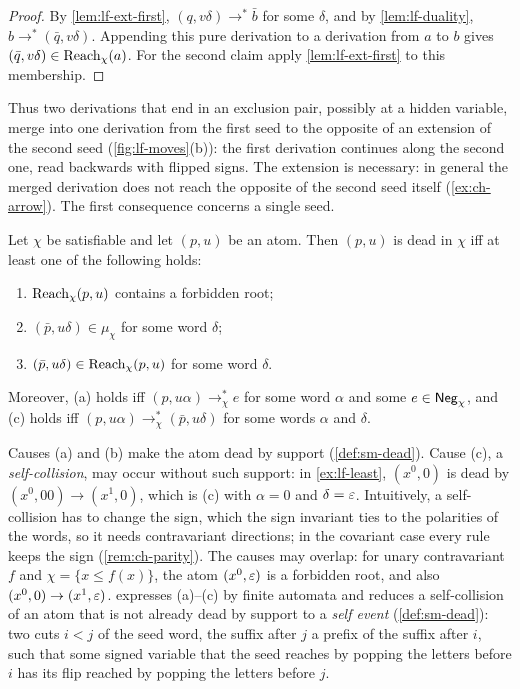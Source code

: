 \begin{proof}
By \cref{lem:lf-ext-first}, $(q,v\delta)\to^*\bar b$ for some $\delta$, and by
\cref{lem:lf-duality}, $b\to^*(\bar q,v\delta)$. Appending this pure
derivation to a derivation from $a$ to $b$ gives
$(\bar q,v\delta)\in \operatorname{Reach}_\chi(a)$. For the second claim apply
\cref{lem:lf-ext-first} to this membership.
\end{proof}

Thus two derivations that end in an exclusion pair, possibly at a hidden
variable, merge into one derivation from the first seed to the opposite of
an extension of the second seed (\cref{fig:lf-moves}(b)): the first
derivation continues along the second one, read backwards with flipped signs.
The extension is necessary: in general the
merged derivation does not reach the opposite of the second seed itself
(\cref{ex:ch-arrow}). The first consequence concerns a single seed.

\begin{corollary}[Deadness]\label{cor:lf-dead}
Let $\chi$ be satisfiable and let $(p,u)$ be an atom. Then $(p,u)$ is dead
in $\chi$ iff at least one of the following holds:
\begin{enumerate}[label=(\alph*),leftmargin=*]
\item $\operatorname{Reach}_\chi(p,u)$ contains a forbidden root;
\item $(\bar p,u\delta)\in\mu_\chi$ for some word $\delta$;
\item $(\bar p,u\delta)\in \operatorname{Reach}_\chi(p,u)$ for some word $\delta$.
\end{enumerate}
Moreover, (a) holds iff $(p,u\alpha)\to^*_\chi e$ for some word $\alpha$ and
some $e\in\mathsf{Neg}_\chi$, and (c) holds iff
$(p,u\alpha)\to^*_\chi(\bar p,u\delta)$ for some words $\alpha$ and $\delta$.
\end{corollary}

Causes (a) and (b) make the atom dead by support (\cref{def:sm-dead}).
Cause (c), a \emph{self-collision}, may occur without such support: in
\cref{ex:lf-least}, $(x^0,0)$ is dead by $(x^0,00)\to(x^1,0)$, which is (c)
with $\alpha=0$ and $\delta=\varepsilon$. Intuitively, a self-collision has to change
the sign, which the sign invariant ties to the polarities of the words, so it
needs contravariant directions; in the covariant case every rule keeps the
sign (\cref{rem:ch-parity}). The causes may overlap: for unary contravariant $f$ and $\chi=\{x\le f(x)\}$, the atom
$(x^0,\varepsilon)$ is a forbidden root, and also $(x^0,0)\to(x^1,\varepsilon)$. 
expresses (a)--(c) by finite automata and reduces a self-collision of an
atom that is not already dead by support to a \emph{self event}
(\cref{def:sm-dead}): two cuts $i<j$ of the seed word, the suffix after $j$ a
prefix of the suffix after $i$, such that some signed variable that the seed
reaches by popping the letters before $i$ has its flip reached by popping
the letters before $j$.
